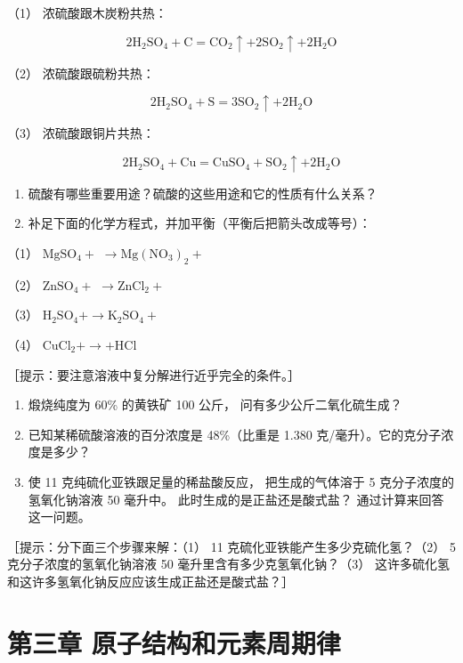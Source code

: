 （1） 浓硫酸跟木炭粉共热：

\[
2 \mathrm{H} _ {2} \mathrm{SO} _ {4} + \mathrm{C} = \mathrm{CO} _ {2} \uparrow + 2 \mathrm{SO} _ {2} \uparrow + 2 \mathrm{H} _ {2} \mathrm{O}
\]

（2） 浓硫酸跟硫粉共热：

\[
2 \mathrm{H} _ {2} \mathrm{SO} _ {4} + \mathrm{S} = 3 \mathrm{SO} _ {2} \uparrow + 2 \mathrm{H} _ {2} \mathrm{O}
\]

（3） 浓硫酸跟铜片共热：

\[
2 \mathrm{H} _ {2} \mathrm{SO} _ {4} + \mathrm{Cu} = \mathrm{CuSO} _ {4} + \mathrm{SO} _ {2} \uparrow + 2 \mathrm{H} _ {2} \mathrm{O}
\]

\begin{enumerate}[start=15]
\item
  硫酸有哪些重要用途？硫酸的这些用途和它的性质有什么关系？
\item
  补足下面的化学方程式，并加平衡（平衡后把箭头改成等号）：
\end{enumerate}

（1） \(\mathrm{MgSO_4 + }\) \(\rightarrow \mathrm{Mg(NO_3)_2 + }\)

（2） \(\mathrm{ZnSO_4 + }\) \(\rightarrow \mathrm{ZnCl_2 + }\)

（3）
\(\mathrm{H}_2\mathrm{SO}_4 + \longrightarrow \mathrm{K}_2\mathrm{SO}_4 +\)

（4） \(\mathrm{CuCl}_2 + \longrightarrow + \mathrm{HCl}\)

［提示：要注意溶液中复分解进行近乎完全的条件。］

\begin{enumerate}[start=17]
\item
  煅烧纯度为 60\% 的黄铁矿 100 公斤， 问有多少公斤二氧化硫生成？
\item
  已知某稀硫酸溶液的百分浓度是 48\%（比重是 1.380
  克/毫升）。它的克分子浓度是多少？
\item
  使 11 克纯硫化亚铁跟足量的稀盐酸反应， 把生成的气体溶于 5
  克分子浓度的氢氧化钠溶液 50 毫升中。 此时生成的是正盐还是酸式盐？
  通过计算来回答这一问题。
\end{enumerate}

［提示：分下面三个步骤来解：（1） 11 克硫化亚铁能产生多少克硫化氢？（2）
5 克分子浓度的氢氧化钠溶液 50 毫升里含有多少克氢氧化钠？（3）
这许多硫化氢和这许多氢氧化钠反应应该生成正盐还是酸式盐？］

\chapter{第三章 原子结构和元素周期律}

